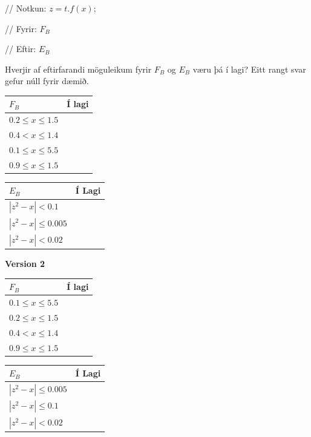 \documentclass{article}
\newcommand{\bo}[1]{\textbf{#1}}
\begin{document}
    // Notkun: $z = t.f(x);$


    // Fyrir: $F_B$


    // Eftir: $E_B$


    Hverjir af eftirfarandi möguleikum fyrir $F_B$ og $E_B$ væru þá í lagi? Eitt
    rangt svar gefur núll fyrir dæmið.

    \begin{tabularx}{\textwidth}{|X|X|}
        \hline
        $F_B$ & \bo{Í lagi} \\ \hline
        $0.2 \leq x \leq 1.5 $ & \\ \hline
        $0.4 < x \leq 1.4 $ & \\ \hline
        $0.1 \leq x \leq 5.5 $ & \\ \hline
        $0.9 \leq x \leq 1.5 $& \\ \hline
        
    \end{tabularx}

    \begin{tabularx}{\textwidth}{|X|X|}
        \hline
        $E_B$ & \bo{Í Lagi} \\ \hline
        $|z^2 - x| < 0.1 $ & \\ \hline
        $|z^2 - x| \leq 0.005 $ & \\ \hline
        $|z^2 - x| < 0.02 $ & \\ \hline
        
    \end{tabularx}


    \bo{Version 2}



    \begin{tabularx}{\textwidth}{|X|X|}
        \hline
        $F_B$ & \bo{Í lagi} \\ \hline
        $0.1 \leq x \leq 5.5 $ & \\ \hline
        $0.2 \leq x \leq 1.5 $ & \\ \hline
        $0.4 < x \leq 1.4 $ & \\ \hline
        $0.9 \leq x \leq 1.5 $& \\ \hline
        
    \end{tabularx}
    \begin{tabularx}{\textwidth}{|X|X|}
        \hline
        $E_B$ & \bo{Í Lagi} \\ \hline
        $|z^2 - x| \leq 0.005 $ & \\ \hline
        $|z^2 - x| \leq 0.1 $ & \\ \hline
        $|z^2 - x| < 0.02 $ & \\ \hline
        
    \end{tabularx}
\end{document}
